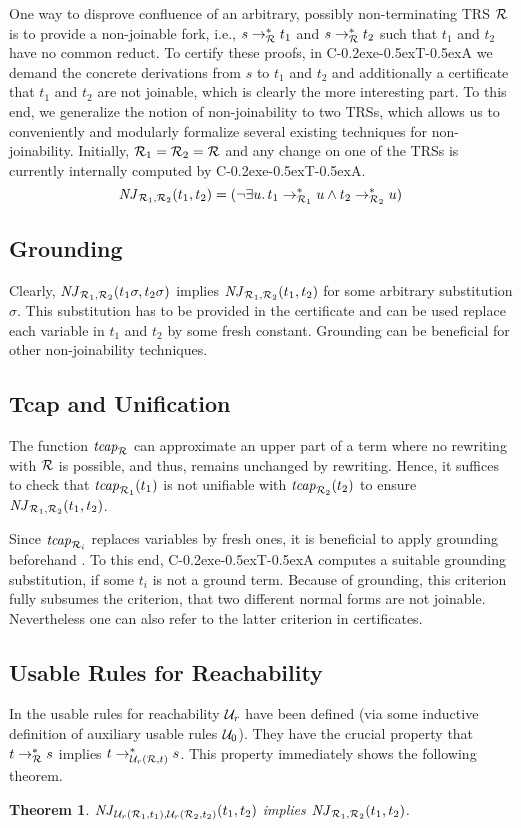 \documentclass[a4paper]{easychair}
\newtheorem{theorem}{Theorem}
\newcommand\ceta{\textsf{C\kern-0.2exe\kern-0.5exT\kern-0.5exA}\xspace}
\newcommand\RR{{\cal R}}
\newcommand\Ur{{\cal U}_r}
\newcommand\Uz{{\cal U}_0}
\newcommand\njin[3]{\mathit{NJ}_{#1}(#2,#3)}
\newcommand\nj[4]{\njin{#1,#2}{#3}{#4}}
\newcommand\tcap[1]{\mathit{tcap}_{#1}}
\begin{document}
One way to disprove confluence of an arbitrary, possibly non-terminating TRS $\RR$ is to
provide a non-joinable fork, i.e., $s \to_\RR^* t_1$ and $s \to_\RR^* t_2$ such that $t_1$ and
$t_2$ have no common reduct. To certify these proofs, in \ceta we demand the concrete derivations
from $s$ to $t_1$ and $t_2$ and additionally a certificate that $t_1$ and $t_2$ are not joinable, which is clearly
the more interesting part. To this end, we generalize the notion of non-joinability to two TRSs,
which allows us to conveniently and modularly formalize several existing
techniques for non-joinability. Initially, $\RR_1 = \RR_2 = \RR$ and any change on one of the TRSs
is currently internally computed by \ceta.
\[
\nj{\RR_1}{\RR_2}{t_1}{t_2} = (\neg \exists u.\, t_1 \to_{\RR_1}^* u \wedge t_2 \to_{\RR_2}^* u)
\]




\subsection{Grounding}
Clearly, $\nj{\RR_1}{\RR_2}{t_1\sigma}{t_2\sigma}$ implies $\nj{\RR_1}{\RR_2}{t_1}{t_2}$ for
some arbitrary substitution $\sigma$. This substitution has to be provided in the certificate
and can be used replace each variable in $t_1$ and $t_2$ by some fresh constant.
Grounding can be beneficial for other non-joinability techniques.

\subsection{Tcap and Unification}
The function $\tcap\RR$ can approximate an upper part of a term where no rewriting with $\RR$
is possible, and thus, remains unchanged by rewriting. Hence, \pagebreak
it suffices to check that $\tcap{\RR_1}(t_1)$ is not unifiable with $\tcap{\RR_2}(t_2)$
to ensure $\nj{\RR_1}{\RR_2}{t_1}{t_2}$.


Since $\tcap{\RR_i}$ replaces variables by fresh ones, it is beneficial to
apply grounding beforehand \cite{ZFM11b}. To this end, \ceta computes a suitable 
grounding substitution, if some $t_i$ is not a ground term. Because of  grounding, 
this criterion fully subsumes the criterion, that two different normal forms are not joinable.
Nevertheless one can also refer to the latter criterion in certificates.

\subsection{Usable Rules for Reachability}
In \cite{Aoto} the usable rules for reachability $\Ur$ have been defined (via some 
inductive definition of auxiliary usable rules $\Uz$). They have
the crucial property that $t \to_\RR^* s$ implies $t \to_{\Ur(\RR,t)}^* s$.
This property immediately shows the following theorem.
\begin{theorem}
\label{usable}
$\nj{\Ur(\RR_1,t_1)}{\Ur(\RR_2,t_2)}{t_1}{t_2}$ implies
$\nj{\RR_1}{\RR_2}{t_1}{t_2}$.
\end{theorem}
\end{document}
